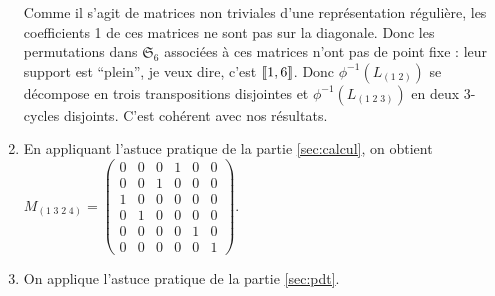 \documentclass[10pt,a4paper,french,landscape]{article}
\DeclarePairedDelimiter\bracketlong{\llbracket}{\rrbracket}
\newcommand{\br}[1]{\bracketlong*{#1}}
\theoremstyle{definition}
\theoremstyle{remark}
\newcommand{\Sy}{\mathfrak{S}}
\newcommand{\1}{\mathbbm{1}}
\newcommand{\Sn}[1][n]{\Sy_{#1}}
\begin{document}
\begin{multicols*}{2}
\begin{enumerate}
Comme il s'agit de matrices non triviales d'une représentation régulière, les coefficients 1 de ces matrices ne sont pas sur la diagonale. Donc les permutations dans $\Sn[6]$ associées à ces matrices n'ont pas de point fixe : leur support est ``plein'', je veux dire, c'est $\br{1,6}$. Donc $\phi^{-1}(L_{(1\; 2)})$ se décompose en trois transpositions disjointes et $\phi^{-1}(L_{(1\; 2\; 3)})$ en deux 3-cycles disjoints. C'est cohérent avec nos résultats.\medskip

\item En appliquant l'astuce pratique de la partie \ref{sec:calcul}, on obtient\\
$M_{(1\;3\;2\;4)}=
\begin{pmatrix}
 0 & 0 & 0 & 1 & 0 & 0 \\
 0 & 0 & 1 & 0 & 0 & 0 \\
 1 & 0 & 0 & 0 & 0 & 0 \\
 0 & 1 & 0 & 0 & 0 & 0 \\
 0 & 0 & 0 & 0 & 1 & 0 \\
 0 & 0 & 0 & 0 & 0 & 1
\end{pmatrix}$.


\item On applique l'astuce pratique de la partie \ref{sec:pdt}.


\end{enumerate}
\end{multicols*}
\end{document}
